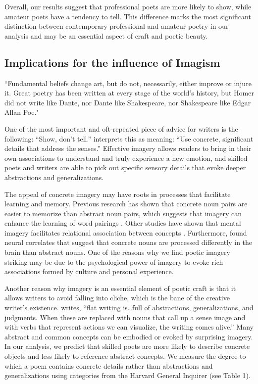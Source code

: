 \documentclass{book}
\begin{document}
Overall, our results suggest that professional poets are more likely to show, while amateur poets have a tendency to tell. This difference marks the most significant distinction between contemporary professional and amateur poetry in our analysis and may be an essential aspect of craft and poetic beauty.

\subsection{Implications for the influence of Imagism}

``Fundamental beliefs change art, but do not, necessarily, either improve or injure it. Great poetry has been written at every stage of the world's history, but Homer did not write like Dante, nor Dante like Shakespeare, nor Shakespeare like Edgar Allan Poe." \citep{lowell1920tendencies}

One of the most important and oft-repeated piece of advice for writers is the following: ``Show, don't tell.'' \cite{Burroway} interprets this as meaning: ``Use concrete, significant details that address the senses.'' Effective imagery allows readers to bring in their own associations to understand and truly experience a new emotion, and skilled poets and writers are able to pick out specific sensory details that evoke deeper abstractions and generalizations. 

The appeal of concrete imagery may have roots in processes that facilitate learning and memory. Previous research has shown that concrete noun pairs are easier to memorize than abstract noun pairs, which suggests that imagery can enhance the learning of word pairings \citep{pairing}. Other studies have shown that mental imagery facilitates relational association between concepts \citep{imagery}. Furthermore, \cite{neuro} found neural correlates that suggest that concrete nouns are processed differently in the brain than abstract nouns. One of the reasons why we find poetic imagery striking may be due to the psychological power of imagery to evoke rich associations formed by culture and personal experience. 

Another reason why imagery is an essential element of poetic craft is that it allows writers to avoid falling into cliche, which is the bane of the creative writer's existence. \cite{Burroway} writes, ``flat writing is\dots full of abstractions, generalizations, and judgments. When these are replaced with nouns that call up a sense image and with verbs that represent actions we can visualize, the writing comes alive.'' Many abstract and common concepts can be embodied or evoked by surprising imagery. In our analysis, we predict that skilled poets are more likely to describe concrete objects and less likely to reference abstract concepts. We measure the degree to which a poem contains concrete details rather than abstractions and generalizations using categories from the Harvard General Inquirer (see Table 1). 
\end{document}
